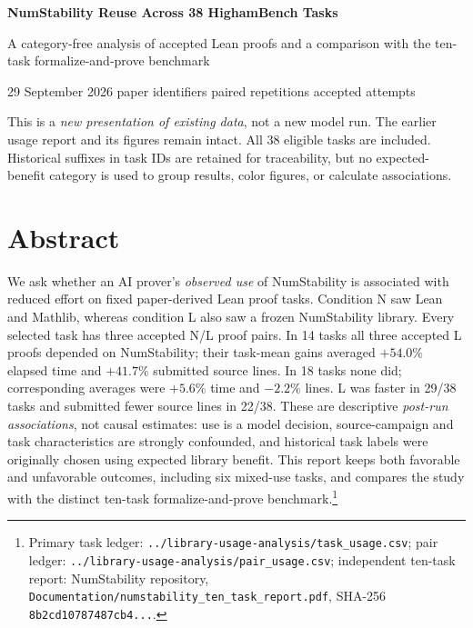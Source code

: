 \documentclass[10pt]{article}
\newcommand{\pathref}[1]{\nolinkurl{#1}}
\begin{document}
\begin{center}
{\LARGE\bfseries\color{Ink}NumStability Reuse Across 38 HighamBench Tasks}\par
\vspace{3pt}
{\large A category-free analysis of accepted Lean proofs and a comparison with the ten-task formalize-and-prove benchmark}\par
\vspace{5pt}
{\small 29 September 2026 \quad\textbar{} paper identifiers \quad\textbar{} paired repetitions \quad\textbar{} accepted attempts}
\end{center}

\colorbox{Pale}{\parbox{0.975\linewidth}{\small
This is a \emph{new presentation of existing data}, not a new model run. The earlier usage report and its figures remain intact. All 38 eligible tasks are included. Historical suffixes in task IDs are retained for traceability, but no expected-benefit category is used to group results, color figures, or calculate associations.}}

\section*{Abstract}
We ask whether an AI prover's \emph{observed use} of NumStability is associated with reduced effort on fixed paper-derived Lean proof tasks. Condition N saw Lean and Mathlib, whereas condition L also saw a frozen NumStability library. Every selected task has three accepted N/L proof pairs. In 14 tasks all three accepted L proofs depended on NumStability; their task-mean gains averaged $+54.0\%$ elapsed time and $+41.7\%$ submitted source lines. In 18 tasks none did; corresponding averages were $+5.6\%$ time and $-2.2\%$ lines. L was faster in 29/38 tasks and submitted fewer source lines in 22/38. These are descriptive \emph{post-run associations}, not causal estimates: use is a model decision, source-campaign and task characteristics are strongly confounded, and historical task labels were originally chosen using expected library benefit. This report keeps both favorable and unfavorable outcomes, including six mixed-use tasks, and compares the study with the distinct ten-task formalize-and-prove benchmark.\footnote{Primary task ledger: \pathref{../library-usage-analysis/task_usage.csv}; pair ledger: \pathref{../library-usage-analysis/pair_usage.csv}; independent ten-task report: NumStability repository, \pathref{Documentation/numstability_ten_task_report.pdf}, SHA-256 \texttt{8b2cd10787487cb4...}.}
\end{document}
